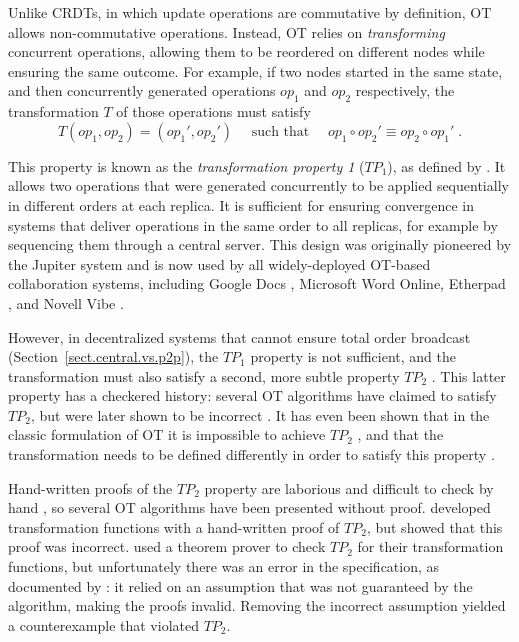 Unlike CRDTs, in which update operations are commutative by definition, OT allows non-commutative
operations. Instead, OT relies on \emph{transforming} concurrent operations, allowing them to be
reordered on different nodes while ensuring the same outcome. For example, if two nodes started in
the same state, and then concurrently generated operations $\mathit{op}_1$ and $\mathit{op}_2$
respectively, the transformation $T$ of those operations must satisfy
\[
  T(\mathit{op}_1, \mathit{op}_2) = (\mathit{op}_1', \mathit{op}_2') \quad\text{ such that }\quad
  \mathit{op}_1 \circ \mathit{op}_2' \equiv \mathit{op}_2 \circ \mathit{op}_1' \;.
\]

This property is known as the \emph{transformation property 1} ($\mathit{TP}_1$), as defined by
\citet{Ressel:1996wx}. It allows two operations that were generated concurrently to be applied
sequentially in different orders at each replica. It is sufficient for ensuring convergence in
systems that deliver operations in the same order to all replicas, for example by sequencing them
through a central server. This design was originally pioneered by the Jupiter system
\cite{Nichols:1995fd} and is now used by all widely-deployed OT-based collaboration systems,
including Google Docs \cite{DayRichter:2010tt}, Microsoft Word Online, Etherpad
\cite{Etherpad:2011um}, and Novell Vibe \cite{Spiewak:2010vw}.

However, in decentralized systems that cannot ensure total order broadcast
(Section~\ref{sect.central.vs.p2p}), the $\mathit{TP}_1$ property is not sufficient, and the
transformation must also satisfy a second, more subtle property $\mathit{TP}_2$
\cite{Ressel:1996wx}. This latter property has a checkered history: several OT algorithms have
claimed to satisfy $\mathit{TP}_2$, but were later shown to be incorrect
\cite{Imine:2003ks,Imine:2006kn,Oster:2005vi}. It has even been shown that in the classic
formulation of OT it is impossible to achieve $\mathit{TP}_2$ \cite{Randolph:2015gj}, and that the
transformation needs to be defined differently in order to satisfy this property
\cite{Oster:2006tr}.

Hand-written proofs of the $\mathit{TP}_2$ property are laborious and difficult to check by hand
\cite{Li:2008hw,Li:2005jq}, so several OT algorithms have been presented without proof.
\citet{Suleiman:1998eu} developed transformation functions with a hand-written proof of
$\mathit{TP}_2$, but \citet{Oster:2005vi} showed that this proof was incorrect.
\citet{Imine:2003ks} used a theorem prover to check $\mathit{TP}_2$ for their transformation
functions, but unfortunately there was an error in the specification, as documented by
\citet{Oster:2005vi}: it relied on an assumption that was not guaranteed by the algorithm, making
the proofs invalid. Removing the incorrect assumption yielded a counterexample that violated
$\mathit{TP}_2$.

